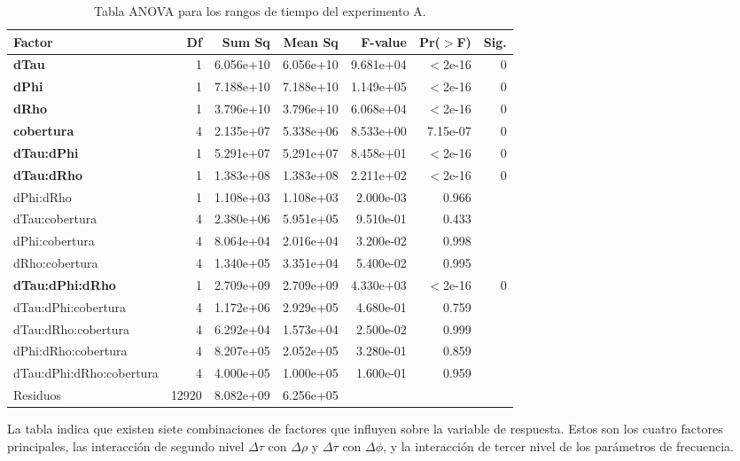 \begin{table}\renewcommand{\tabcolsep}{3pt}
    \centering
    \small
    \begin{tabular}{lrrrrrr}
        \hline 
        Factor & Df & Sum Sq & Mean Sq & F-value & Pr($>$F) & Sig.\\
        \hline 
        \textbf{dTau} & 1 & 6.056e+10 & 6.056e+10 & 9.681e+04 & $<$2e-16 & 0\\
        \textbf{dPhi} & 1 & 7.188e+10 & 7.188e+10 & 1.149e+05 & $<$2e-16 & 0\\
        \textbf{dRho} & 1 & 3.796e+10 & 3.796e+10 & 6.068e+04 & $<$2e-16 & 0\\
        \textbf{cobertura} & 4 & 2.135e+07 & 5.338e+06 & 8.533e+00 & 7.15e-07 & 0\\
        \textbf{dTau:dPhi} & 1 & 5.291e+07 & 5.291e+07 & 8.458e+01 & $<$2e-16 & 0\\
        \textbf{dTau:dRho} & 1 & 1.383e+08 & 1.383e+08 & 2.211e+02 & $<$2e-16 & 0\\
        dPhi:dRho & 1 & 1.108e+03 & 1.108e+03 & 2.000e-03 & 0.966 & \\
        dTau:cobertura & 4 & 2.380e+06 & 5.951e+05 & 9.510e-01 & 0.433 & \\
        dPhi:cobertura & 4 & 8.064e+04 & 2.016e+04 & 3.200e-02 & 0.998 & \\
        dRho:cobertura & 4 & 1.340e+05 & 3.351e+04 & 5.400e-02 & 0.995 & \\
        \textbf{dTau:dPhi:dRho} & 1 & 2.709e+09 & 2.709e+09 & 4.330e+03 & $<$2e-16 & 0\\
        dTau:dPhi:cobertura & 4 & 1.172e+06 & 2.929e+05 & 4.680e-01 & 0.759 & \\
        dTau:dRho:cobertura & 4 & 6.292e+04 & 1.573e+04 & 2.500e-02 & 0.999 & \\
        dPhi:dRho:cobertura & 4 & 8.207e+05 & 2.052e+05 & 3.280e-01 & 0.859 & \\
        dTau:dPhi:dRho:cobertura & 4 & 4.000e+05 & 1.000e+05 & 1.600e-01 & 0.959 &\\
        Residuos & 12920 & 8.082e+09 & 6.256e+05\\
        \hline
    \end{tabular}
    \caption{Tabla ANOVA para los rangos de tiempo del experimento A.}
    \label{tab:anovaA}
\end{table}

La tabla indica que existen siete combinaciones de factores que influyen sobre la variable de respuesta. Estos son los cuatro factores principales, las interacción de segundo nivel $\Delta \tau$ con $\Delta \rho$ y $\Delta \tau$ con $\Delta \phi$, y la interacción de tercer nivel de los parámetros de frecuencia.

